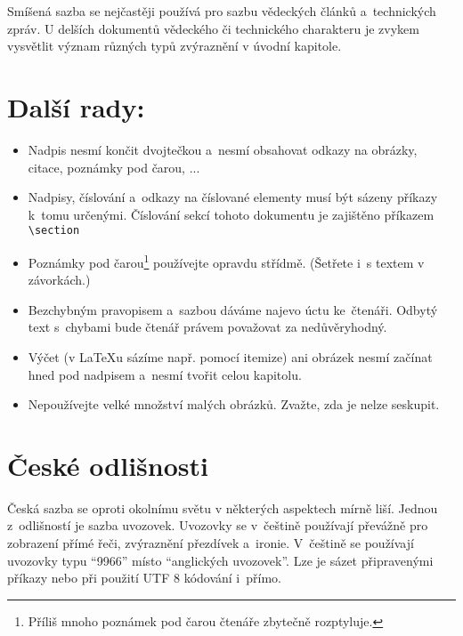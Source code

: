 \documentclass[10pt,twocolumn]{article}
\begin{document}
        Smíšená sazba se nejčastěji používá pro sazbu vědeckých článků a~technických zpráv.
        U delších dokumentů vědeckého či technického charakteru je zvykem vysvětlit význam různých typů zvýraznění v úvodní kapitole.
    \section{Další rady:}\label{sec:3}
        \begin{itemize}
            \item Nadpis nesmí končit dvojtečkou a~nesmí obsahovat odkazy na obrázky, citace, poznámky pod čarou, ...
            \item Nadpisy, číslování a~odkazy na číslované elementy musí být sázeny příkazy k~tomu určenými.
            Číslování sekcí tohoto dokumentu je zajištěno příkazem \verb+\section+
            \item Poznámky pod čarou\footnote{Příliš mnoho poznámek pod čarou čtenáře zbytečně rozptyluje.} používejte opravdu střídmě.
            (Šetřete i~s textem v závorkách.)
            
            \item Bezchybným pravopisem a~sazbou dáváme najevo úctu ke~čtenáři.
            Odbytý text s~chybami bude čtenář právem považovat za nedůvěryhodný.
            
            \item Výčet (v \LaTeX{}u sázíme např. pomocí itemize) ani obrázek nesmí začínat hned pod nadpisem a~nesmí tvořit celou kapitolu.
            
            \item Nepoužívejte velké množství malých obrázků.
            Zvažte, zda je nelze seskupit.
        \end{itemize}
    \section{České odlišnosti}\label{sec:4}
        Česká sazba se oproti okolnímu světu v některých aspektech mírně liší.
        Jednou z~odlišností je sazba uvozovek.
        Uvozovky se v~češtině používají převážně pro zobrazení přímé řeči, zvýraznění přezdívek a~ironie.
        V~češtině se používají uvozovky typu \enquote{9966} místo \enquote{anglických uvozovek}.
        Lze je sázet připravenými příkazy nebo při použití UTF\textendash{} 8 kódování i~přímo.
        
\end{document}
